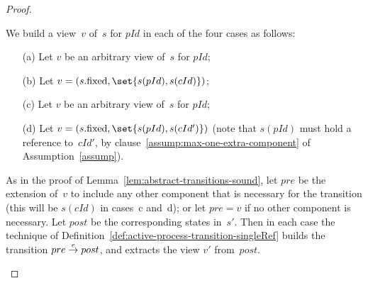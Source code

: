 \begin{proof}
\begin{enumerate}
We build a view~$v$ of~$s$ for $pId$ in each of the four cases as follows:
\begin{enumerate}
\item[(a)] Let $v$ be an arbitrary view of~$s$ for $pId$;

\item[(b)] Let $v = (s.\fixed, \set{s(pId), s(cId)})$;

\item[(c)] Let $v$ be an arbitrary view of~$s$ for $pId$;

\item[(d)] Let $v = (s.\fixed, \set{s(pId), s(cId')})$
  (note that $s(pId)$ must hold a reference to~$cId'$, by
  clause~\ref{assump:max-one-extra-component} of Assumption~\ref{assump}).
\end{enumerate}




As in the proof of Lemma~\ref{lem:abstract-transitions-sound}, let $pre$ be
the extension of~$v$ to include any other component that is necessary for the
transition (this will be $s(cId)$ in cases~c and~d); or let $pre = v$ if no
other component is necessary.  Let $post$ be the corresponding states in~$s'$.
Then in each case the technique of
Definition~\ref{def:active-process-transition-singleRef} builds the transition
\( pre \stackrel{e}\rightarrow post \), and extracts the view $v'$ from~$post$.



\end{enumerate}
\end{proof}
